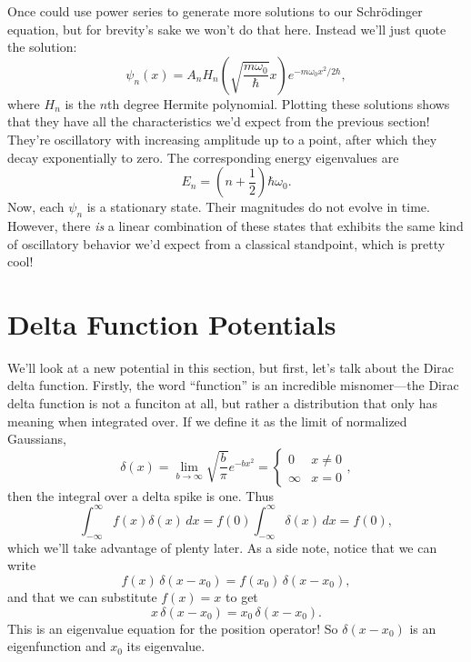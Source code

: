 \documentclass[../p052main.tex]{subfiles}
\begin{document}
Once could use power series to generate more solutions to our Schrödinger equation, but for brevity's sake we won't do that here.
Instead we'll just quote the solution:
\[ \psi_n(x) = A_n H_n \left( \sqrt{\frac{m\omega_0}{\hbar}} x \right) e^{-m\omega_0x^2 / 2\hbar}, \]
where $H_n$ is the $n$th degree Hermite polynomial.
Plotting these solutions shows that they have all the characteristics we'd expect from the previous section!
They're oscillatory with increasing amplitude up to a point, after which they decay exponentially to zero.
The corresponding energy eigenvalues are
\[ E_n = \left( n + \frac{1}{2} \right) \hbar \omega_0. \]
Now, each $\psi_n$ is a stationary state.
Their magnitudes do not evolve in time.
However, there \textit{is} a linear combination of these states that exhibits the same kind of oscillatory behavior we'd expect from a classical standpoint, which is pretty cool!

\section{Delta Function Potentials}
We'll look at a new potential in this section, but first, let's talk about the Dirac delta function.
Firstly, the word ``function'' is an incredible misnomer---the Dirac delta function is not a funciton at all, but rather a distribution that only has meaning when integrated over.
If we define it as the limit of normalized Gaussians,
\[ \delta (x) = \lim_{b \to \infty} \sqrt{\frac{b}{\pi}} e^{-bx^2} = \begin{cases} 0 & x \neq 0 \\ \infty & x = 0 \end{cases}, \]
then the integral over a delta spike is one.
Thus %
\[ \int_{-\infty}^{\infty} f(x) \delta(x) \,dx = f(0) \int_{-\infty}^{\infty} \delta(x) \,dx = f(0), \]
which we'll take advantage of plenty later.
As a side note, notice that we can write
\[ f(x) \,\delta (x - x_0) = f(x_0) \,\delta (x - x_0), \]
and that we can substitute $f(x) = x$ to get
\[ x \,\delta (x - x_0) = x_0 \,\delta (x - x_0). \]
This is an eigenvalue equation for the position operator!
So $\delta (x - x_0)$ is an eigenfunction and $x_0$ its eigenvalue.
\end{document}
